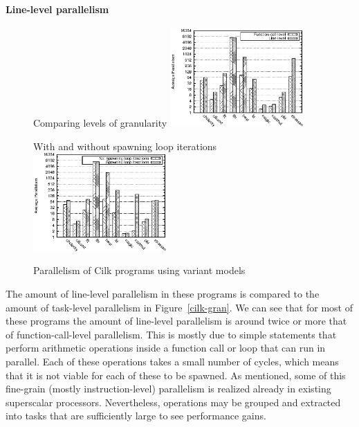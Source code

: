 \paragraph{Line-level parallelism}

\begin{figure}
 \begin{center}
  \begin{SubFloat}{\label{cilk-gran}Comparing levels of granularity}
   \includegraphics[width=2.0in]{cilk-gran}
  \end{SubFloat}
 \qquad
  \begin{SubFloat}{\label{cilk-loop}With and without spawning loop iterations}
   \includegraphics[width=2.0in]{cilk-loop}
  \end{SubFloat}
 \end{center}
 \caption{Parallelism of Cilk programs using variant models}
\end{figure}

The amount of line-level parallelism in these programs is compared to the amount of task-level parallelism in Figure~\ref{cilk-gran}.
We can see that for most of these programs the amount of line-level parallelism is around twice or more that of function-call-level parallelism.
This is mostly due to simple statements that perform arithmetic operations inside a function call or loop that can run in parallel.
Each of these operations takes a small number of cycles, which means that it is not viable for each of these to be spawned.
As mentioned, some of this fine-grain (mostly instruction-level) parallelism is realized already in existing superscalar processors.
Nevertheless, operations may be grouped and extracted into tasks that are sufficiently large to see performance gains.

